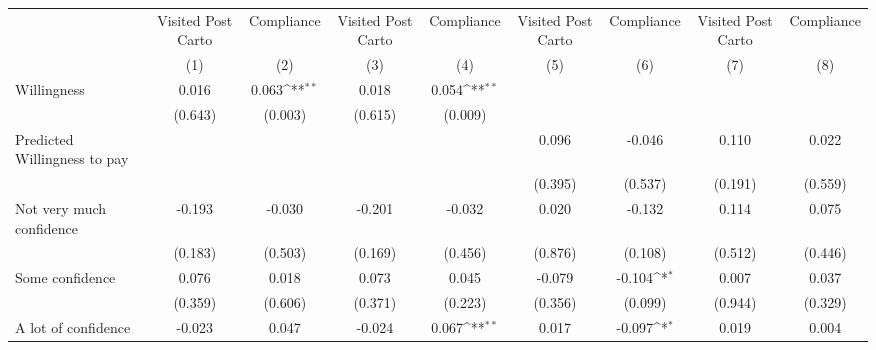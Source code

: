 {
\def\sym#1{\ifmmode^{#1}\else\(^{#1}\)\fi}
\begin{tabular}{l*{8}{c}}
\hline\hline
                &\multicolumn{1}{c}{Visited Post Carto}&\multicolumn{1}{c}{Compliance}&\multicolumn{1}{c}{Visited Post Carto}&\multicolumn{1}{c}{Compliance}&\multicolumn{1}{c}{Visited Post Carto}&\multicolumn{1}{c}{Compliance}&\multicolumn{1}{c}{Visited Post Carto}&\multicolumn{1}{c}{Compliance}\\
                &\multicolumn{1}{c}{(1)}         &\multicolumn{1}{c}{(2)}         &\multicolumn{1}{c}{(3)}         &\multicolumn{1}{c}{(4)}         &\multicolumn{1}{c}{(5)}         &\multicolumn{1}{c}{(6)}         &\multicolumn{1}{c}{(7)}         &\multicolumn{1}{c}{(8)}         \\
\hline
Willingness     &    0.016         &    0.063\sym{**} &    0.018         &    0.054\sym{**} &                  &                  &                  &                  \\
                &  (0.643)         &  (0.003)         &  (0.615)         &  (0.009)         &                  &                  &                  &                  \\
Predicted Willingness to pay&                  &                  &                  &                  &    0.096         &   -0.046         &    0.110         &    0.022         \\
                &                  &                  &                  &                  &  (0.395)         &  (0.537)         &  (0.191)         &  (0.559)         \\
Not very much confidence&   -0.193         &   -0.030         &   -0.201         &   -0.032         &    0.020         &   -0.132         &    0.114         &    0.075         \\
                &  (0.183)         &  (0.503)         &  (0.169)         &  (0.456)         &  (0.876)         &  (0.108)         &  (0.512)         &  (0.446)         \\
Some confidence &    0.076         &    0.018         &    0.073         &    0.045         &   -0.079         &   -0.104\sym{*}  &    0.007         &    0.037         \\
                &  (0.359)         &  (0.606)         &  (0.371)         &  (0.223)         &  (0.356)         &  (0.099)         &  (0.944)         &  (0.329)         \\
A lot of confidence&   -0.023         &    0.047         &   -0.024         &    0.067\sym{**} &    0.017         &   -0.097\sym{*}  &    0.019         &    0.004         \\

\end{tabular}}

